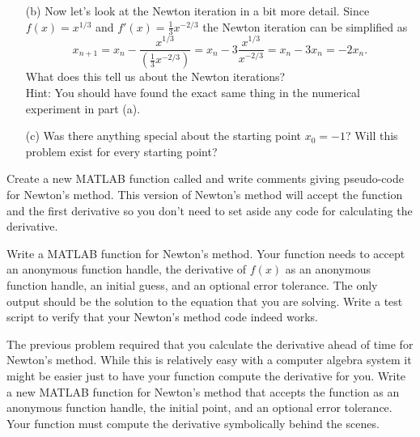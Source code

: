 \begin{problem}
\begin{enumerate}
\item[(b)] Now let's look at the Newton iteration in a bit more detail.  Since $f(x) =
    x^{1/3}$ and $f'(x) = \frac{1}{3} x^{-2/3}$ the Newton iteration can be simplified as 
    \[ x_{n+1} = x_n - \frac{x^{1/3}}{ \left( \frac{1}{3} x^{-2/3} \right)} = x_n - 3 \frac{x^{1/3}}{x^{-2/3}} =
    x_n - 3x_n = -2x_n. \]
    What does this tell us about the Newton iterations?  \\ Hint: You should have found
    the exact same thing in the numerical experiment in part (a).
\item[(c)] Was there anything special about the starting point $x_0=-1$?  Will this
    problem exist for every starting point?
    \end{enumerate}
\end{problem}

\begin{problem}
    Create a new MATLAB function called  and write comments giving
    pseudo-code for Newton's method.  This version of Newton's method will accept the
    function and the first derivative so you don't need to set aside any code for
    calculating the derivative.
\end{problem}

\begin{problem}
    Write a MATLAB function for Newton's method.  Your function needs to accept an
    anonymous function handle, the derivative of $f(x)$ as an anonymous function handle,
    an initial guess, and an optional error tolerance. The only output should be the
    solution to the equation that you are solving.  Write a test script to verify that
    your Newton's method code indeed works.
    \\
\end{problem}

\begin{problem}
    The previous problem required that you calculate the derivative ahead of time for
    Newton's method.  While this is relatively easy with a computer algebra system it
    might be easier just to have your function compute the derivative for you.  Write a
    new MATLAB function for Newton's method that accepts the function as an anonymous
    function handle, the initial point, and an optional error tolerance.  Your function
    must compute the derivative symbolically behind the scenes. \\
\end{problem}

